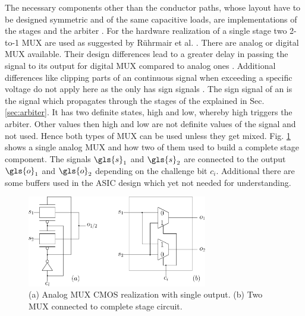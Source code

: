The necessary components other than the conductor paths, whose layout have to be designed symmetric and of the same capacitive loads, are implementations of the stages and the arbiter \cite{Maes2012ExperimentalCMOS}.
For the hardware realization of a single stage two 2-to-1 \ac{MUX} are used as suggested by Rührmair et al. \cite{Ruhrmair2013PUFData, Lee2004AApplications}.
There are analog or digital \ac{MUX} available.
Their design differences lead to a greater delay in passing the signal to its output for digital \ac{MUX} compared to analog ones \cite{2016MultiplexerWikipedia}.
Additional differences like clipping parts of an continuous signal when exceeding a specific voltage do not apply here as the \apuf
only has sign signals \cite{Semiconductor2002BasicComparison}.
The sign signal of an \apuf is the signal which propagates through the stages of the \apuf explained in Sec. \ref{sec:arbiter}.
It has two definite states, high and low, whereby high triggers the arbiter.
Other values then high and low are not definite values of the signal and not used.
Hence both types of \ac{MUX} can be used unless they get mixed.
Fig. \ref{fig:multiplexer} shows a single analog \ac{MUX} and how two of them used to build a complete stage component.
The signals $\gls{s}_1$ and $\gls{s}_2$ are connected to the output $\gls{o}_1$ and $\gls{o}_2$ depending on the challenge bit $c_i$.
Additional there are some buffers used in the \ac{ASIC} design which yet not needed for understanding.

\begin{figure}[ht]
\centering
\includegraphics[width=0.70\textwidth]{images/stage_circuit.eps}
\caption[Analog \acs{MUX} and stage circuit]{(a) Analog \ac{MUX} \ac{CMOS} realization with single output.
(b) Two \acs{MUX} connected to complete stage circuit.}
\label{fig:multiplexer}
\end{figure}

